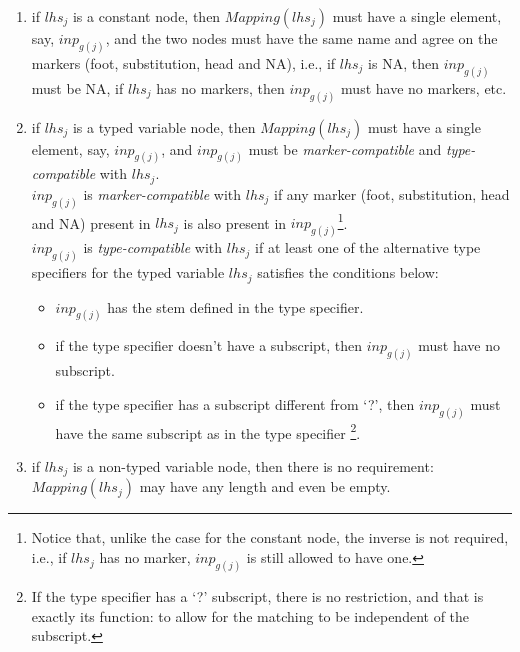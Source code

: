 \begin{enumerate} 
 
\item if $lhs_j$ is a constant node, then $Mapping(lhs_j)$ must have a 
        single element, say, $inp_{g(j)}$, and the two nodes must have the same 
        name and agree on the markers (foot, substitution, head and NA), i.e., 
        if $lhs_j$ is NA, then $inp_{g(j)}$ must be NA, 
        if $lhs_j$ has no markers, then $inp_{g(j)}$ must have no markers, etc. 
 
\item if $lhs_j$ is a typed variable node, then $Mapping(lhs_j)$ must have a 
        single element, say, $inp_{g(j)}$, and $inp_{g(j)}$ must be 
        {\it marker-compatible} and 
        {\it type-compatible} with $lhs_j$. \\ 
        $inp_{g(j)}$ is 
        {\it marker-compatible} with $lhs_j$ if any marker 
         (foot, substitution, head and NA) present in $lhs_j$ is also 
        present in $inp_{g(j)}$\footnote{Notice that, unlike the case for the         constant node, the inverse is not required,         i.e., if $lhs_j$ has no marker, $inp_{g(j)}$ is still         allowed to have one.}.\\ 
        $inp_{g(j)}$ is {\it type-compatible} with $lhs_j$ 
        if at least one of the alternative 
        type specifiers for the typed variable $lhs_j$ satisfies 
        the conditions below: 
 
\begin{itemize} 
\item   $inp_{g(j)}$ has the stem defined in the type specifier. 
\item   if the type specifier doesn't have a subscript, then 
        $inp_{g(j)}$ must have no subscript. 
\item   if the type specifier has a subscript different from `?', then 
        $inp_{g(j)}$ must have the same subscript as in the type specifier 
        \footnote{If the type specifier has a `?' subscript, there is no         restriction, and that is exactly its function: to allow for the         matching to be independent of the subscript.}. 
\end{itemize} 
 
\item if $lhs_j$ is a non-typed variable node, then there is no 
        requirement: $Mapping(lhs_j)$ may have any length and even be 
        empty. 
\end{enumerate} 
        
